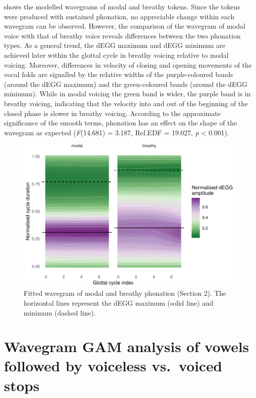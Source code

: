 \documentclass[
  11pt,
  a4paper,
]{article}
\begin{document}
 shows the modelled wavegrams of modal and breathy
tokens. Since the tokens were produced with sustained phonation, no
appreciable change within each wavegram can be observed. However, the
comparison of the wavegram of modal voice with that of breathy voice
reveals differences between the two phonation types. As a general trend,
the dEGG maximum and dEGG minimum are achieved later within the glottal
cycle in breathy voicing relative to modal voicing. Moreover,
differences in velocity of closing and opening movements of the vocal
folds are signalled by the relative widths of the purple-coloured bands
(around the dEGG maximum) and the green-coloured bands (around the dEGG
minimum). While in modal voicing the green band is wider, the purple
band is in breathy voicing, indicating that the velocity into and out of
the beginning of the closed phase is slower in breathy voicing.
According to the approximate significance of the smooth terms, phonation
has an effect on the shape of the wavegram as expected (\emph{F}(14.681)
= 3.187, Ref.EDF = 19.027, \emph{p} \textless{} 0.001).

\begin{figure}
\includegraphics[width=\linewidth]{2019-wavegram_files/figure-latex/surface-p-1} \caption{Fitted wavegram of modal and breathy phonation (Section 2). The horizontal lines represent the dEGG maximum (solid line) and minimum (dashed line).}\label{f:surface-p}
\end{figure}

\hypertarget{wavegram-gam-analysis-of-vowels-followed-by-voiceless-vs.-voiced-stops}{%
\section{Wavegram GAM analysis of vowels followed by voiceless
vs.~voiced
stops}\label{wavegram-gam-analysis-of-vowels-followed-by-voiceless-vs.-voiced-stops}}
\end{document}

